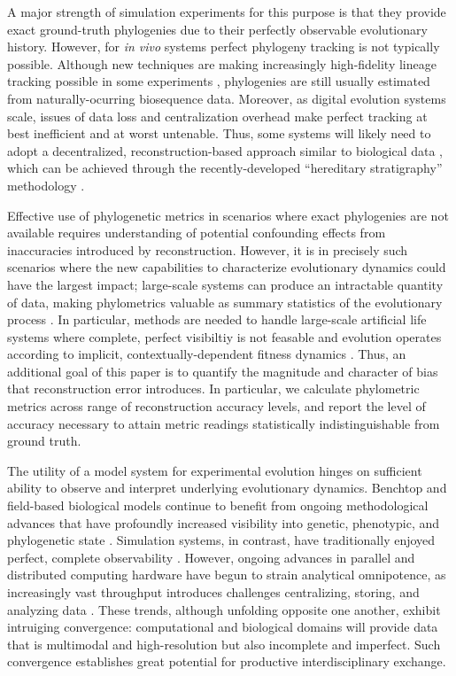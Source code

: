 A major strength of simulation experiments for this purpose is that they provide exact ground-truth phylogenies due to their perfectly observable evolutionary history.
However, for \textit{in vivo} systems perfect phylogeny tracking is not typically possible. Although new techniques are making increasingly high-fidelity lineage tracking possible in some experiments \citep{nozoe2017inferring,woodworth2017building}, phylogenies are still usually estimated from naturally-ocurring biosequence data.
Moreover, as digital evolution systems scale, issues of data loss and centralization overhead make perfect tracking at best inefficient and at worst untenable.
Thus, some systems will likely need to adopt a decentralized, reconstruction-based approach similar to biological data \citep{moreno2024analysis}, which can be achieved through the recently-developed ``hereditary stratigraphy'' methodology \citep{moreno2022hstrat}.

Effective use of phylogenetic metrics in scenarios where exact phylogenies are not available requires understanding of potential confounding effects from inaccuracies introduced by reconstruction.
However, it is in precisely such scenarios where the new capabilities to characterize evolutionary dynamics could have the largest impact; large-scale systems can produce an intractable quantity of data, making phylometrics valuable as summary statistics of the evolutionary process \citep{dolson2020interpreting}.
In particular, methods are needed to handle large-scale artificial life systems where complete, perfect visibiltiy is not feasable and evolution operates according to implicit, contextually-dependent fitness dynamics \citep{moreno2022exploring,kojima2023implementation}.
Thus, an additional goal of this paper is to quantify the magnitude and character of bias that reconstruction error introduces.
In particular, we calculate phylometric metrics across range of reconstruction accuracy levels, and report the level of accuracy necessary to attain metric readings statistically indistinguishable from ground truth.

The utility of a model system for experimental evolution hinges on sufficient ability to observe and interpret underlying evolutionary dynamics.
Benchtop and field-based biological models continue to benefit from ongoing methodological advances that have profoundly increased visibility into genetic, phenotypic, and phylogenetic state \citep{woodworth2017building,blomberg2011measuring,schneider2019past}.
Simulation systems, in contrast, have traditionally enjoyed perfect, complete observability \citep{hindre2012new}.
However, ongoing advances in parallel and distributed computing hardware have begun to strain analytical omnipotence, as increasingly vast throughput introduces challenges centralizing, storing, and analyzing data \citep{klasky2021data}.
These trends, although unfolding opposite one another, exhibit intruiging convergence: computational and biological domains will provide data that is multimodal and high-resolution but also incomplete and imperfect.
Such convergence establishes great potential for productive interdisciplinary exchange.


